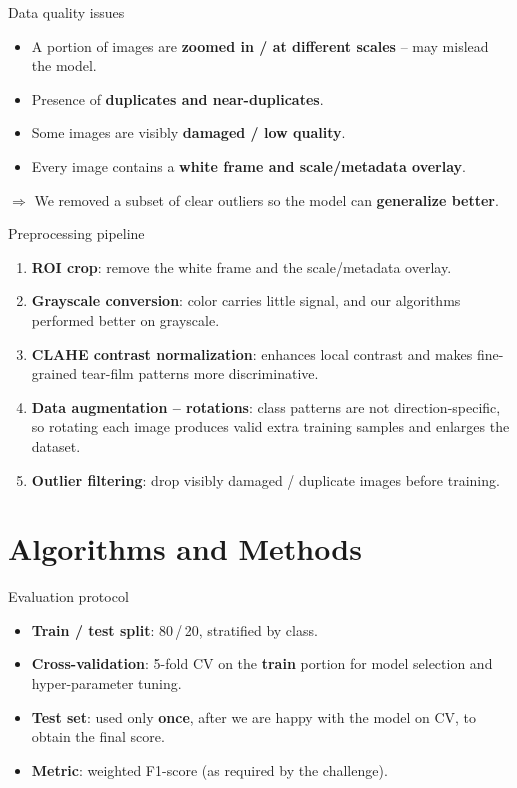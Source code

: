 \documentclass[aspectratio=169]{beamer}
\begin{document}
\begin{frame}{Data quality issues}
    \begin{itemize}
        \item A portion of images are \textbf{zoomed in / at different scales} -- may mislead the model.
        \item Presence of \textbf{duplicates and near-duplicates}.
        \item Some images are visibly \textbf{damaged / low quality}.
        \item Every image contains a \textbf{white frame and scale/metadata overlay}.
    \end{itemize}
    \vspace{0.5em}
    $\Rightarrow$ We removed a subset of clear outliers so the model can \textbf{generalize better}.
\end{frame}

\begin{frame}{Preprocessing pipeline}
    \begin{enumerate}
        \item \textbf{ROI crop}: remove the white frame and the scale/metadata overlay.
        \item \textbf{Grayscale conversion}: color carries little signal, and our algorithms
              performed better on grayscale.
        \item \textbf{CLAHE contrast normalization}: enhances local contrast and makes
              fine-grained tear-film patterns more discriminative.
        \item \textbf{Data augmentation -- rotations}: class patterns are not direction-specific,
              so rotating each image produces valid extra training samples and enlarges the dataset.
        \item \textbf{Outlier filtering}: drop visibly damaged / duplicate images before training.
    \end{enumerate}
\end{frame}

\section{Algorithms and Methods}

\begin{frame}{Evaluation protocol}
    \begin{itemize}
        \item \textbf{Train / test split}: 80\,/\,20, stratified by class.
        \item \textbf{Cross-validation}: 5-fold CV on the \textbf{train} portion for model selection
              and hyper-parameter tuning.
        \item \textbf{Test set}: used only \textbf{once}, after we are happy with the model on CV,
              to obtain the final score.
        \item \textbf{Metric}: weighted F1-score (as required by the challenge).
    \end{itemize}
\end{frame}
\end{document}
